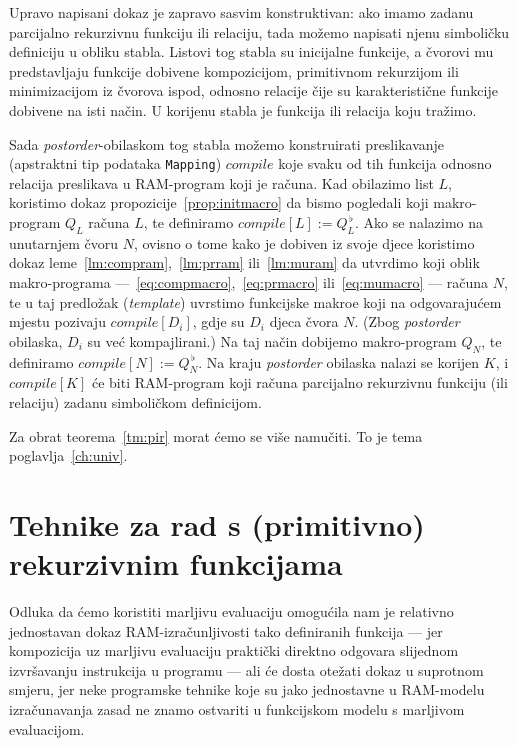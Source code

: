 Upravo napisani dokaz je zapravo sasvim konstruktivan: ako imamo zadanu parcijalno rekurzivnu funkciju ili relaciju, tada možemo napisati njenu simboličku definiciju u obliku stabla. Listovi tog stabla su inicijalne funkcije, a čvorovi mu predstavljaju funkcije dobivene kompozicijom, primitivnom rekurzijom ili minimizacijom iz čvorova ispod, odnosno relacije čije su karakteristične funkcije dobivene na isti način. U korijenu stabla je funkcija ili relacija koju tražimo.

Sada \emph{postorder}-obilaskom tog stabla možemo konstruirati preslikavanje (apstraktni tip podataka \texttt{Mapping}) $compile$ koje svaku od tih funkcija odnosno relacija preslikava u RAM-program koji je računa. Kad obilazimo list $L$, koristimo dokaz propozicije~\ref{prop:initmacro} da bismo pogledali koji makro-program $Q_L$ računa $L$, te definiramo $compile[L]:=Q_L^{\,\flat}$. Ako se nalazimo na unutarnjem čvoru $N$, ovisno o tome kako je dobiven iz svoje djece koristimo dokaz leme~\ref{lm:compram},~\ref{lm:prram} ili~\ref{lm:muram} da utvrdimo koji oblik makro-programa ---~\eqref{eq:compmacro},~\eqref{eq:prmacro} ili~\eqref{eq:mumacro} --- računa $N$, te u taj predložak (\emph{template}) uvrstimo funkcijske makroe koji na odgovarajućem mjestu pozivaju $compile[D_i]$, gdje su $D_i$ djeca čvora $N$. (Zbog \emph{postorder} obilaska, $D_i$ su već kompajlirani.) Na taj način dobijemo makro-program $Q_N$, te definiramo $compile[N]:=Q_N^{\,\flat}$. Na kraju \emph{postorder} obilaska nalazi se korijen $K$, i $compile[K]$ će biti RAM-program koji računa parcijalno rekurzivnu funkciju (ili relaciju) zadanu simboličkom definicijom.

Za obrat teorema~\ref{tm:pir} morat ćemo se više namučiti. To je tema poglavlja~\ref{ch:univ}.

\section{Tehnike za rad s (primitivno) rekurzivnim funkcijama}\label{sec:tech}

Odluka da ćemo koristiti marljivu evaluaciju omogućila nam je relativno jednostavan dokaz RAM-izračunljivosti tako definiranih funkcija --- jer kompozicija uz marljivu evaluaciju praktički direktno odgovara slijednom izvršavanju instrukcija u programu --- ali će dosta otežati dokaz u suprotnom smjeru, jer neke programske tehnike koje su jako jednostavne u RAM-modelu izračunavanja zasad ne znamo ostvariti u funkcijskom modelu s marljivom evaluacijom.

